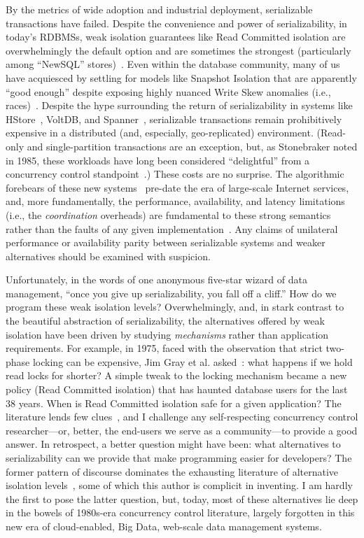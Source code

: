 
By the metrics of wide adoption and industrial deployment, serializable transactions have failed. Despite the convenience and power of serializability, in today's RDBMSs, weak isolation guarantees like Read Committed isolation are overwhelmingly the default option and are sometimes the strongest (particularly among ``NewSQL'' stores)~\cite{hat-vldb}. Even within the database community, many of us have acquiesced by settling for models like Snapshot Isolation that are apparently ``good enough'' despite exposing highly nuanced Write Skew anomalies (i.e., races)~\cite{adya-isolation}. Despite the hype surrounding the return of serializability in systems like HStore~\cite{hstore}, VoltDB, and Spanner~\cite{spanner}, serializable transactions remain prohibitively expensive in a distributed (and, especially, geo-replicated) environment. (Read-only and single-partition transactions are an exception, but, as Stonebraker noted in 1985, these workloads have long been considered ``delightful'' from a concurrency control standpoint~\cite{stonebraker1985case}.) These costs are no surprise. The algorithmic forebears of these new systems~\cite{liskov-clocks,whitney-hpts,garcia-mm} pre-date the era of large-scale Internet services, and, more fundamentally, the performance, availability, and latency limitations (i.e., the \textit{coordination} overheads) are fundamental to these strong semantics rather than the faults of any given implementation~\cite{coord-avoid}. Any claims of unilateral performance or availability parity between serializable systems and weaker alternatives should be examined with suspicion.

Unfortunately, in the words of one anonymous five-star wizard of data management, ``once you give up serializability, you fall off a cliff.'' How do we program these weak isolation levels? Overwhelmingly, and, in stark contrast to the beautiful abstraction of serializability, the alternatives offered by weak isolation have been driven by studying \textit{mechanisms} rather than application requirements. For example, in 1975, faced with the observation that strict two-phase locking can be expensive, Jim Gray et al. asked~\cite{gray-isolation}: what happens if we hold read locks for shorter? A simple tweak to the locking mechanism became a new policy (Read Committed isolation) that has haunted database users for the last 38 years. When is Read Committed isolation safe for a given application? The literature lends few clues~\cite{bernstein-semantic}, and I challenge any self-respecting concurrency control researcher---or, better, the end-users we serve as a community---to provide a good answer. In retrospect, a better question might have been: what alternatives to serializability can we provide that make programming easier for developers? The former pattern of discourse dominates the exhausting literature of alternative isolation levels~\cite{hat-vldb}, some of which this author is complicit in inventing. I am hardly the first to pose the latter question, but, today, most of these alternatives lie deep in the bowels of 1980s-era concurrency control literature, largely forgotten in this new era of cloud-enabled, Big Data, web-scale data management systems.

